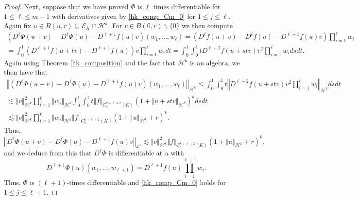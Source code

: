 \documentclass[11pt,reqno]{amsart}
\numberwithin{equation}{section}
\providecommand{\norm}[1]{\left\Vert#1\right\Vert}
\def\ls{\lesssim}
\providecommand{\norm}[1]{\left\Vert#1\right\Vert}
\def\ls{\lesssim}
\def\h{\mathcal{H}}
\def\L{\mathcal{L}}
\begin{document}
\begin{proof}
Next, suppose that we have proved $\Phi$ is $\ell$ times differentiable for $1\le \ell \le m-1$ with derivatives given by \eqref{hk_comp_Cm_0} for $1\le j \le \ell$.    Again fix $u \in B(u,r) \subseteq \mathcal{E}_K \cap \h^k$.  For $v \in B(0,r) \backslash \{0\}$ we then compute 
\begin{multline}
(D^\ell \Phi(u+v)  - D^\ell\Phi(u) - D^{\ell+1} f(u)v) (w_1,\dotsc,w_\ell) = (D^\ell f(u+v) -D^\ell f(u) - D^{\ell+1}f(u)v) \prod_{i=1}^\ell w_i  \\
= \int_0^1 (D^{\ell+1} f(u+tv) - D^{\ell+1}f(u))v \prod_{i=1}^\ell w_i dt = \int_0^1 \int_0^1 t D^{\ell+2} f(u+stv) v^2 \prod_{i=1}^\ell w_i ds dt. 
\end{multline}
Again using Theorem \ref{hk_composition} and the fact that $\h^k$ is an algebra, we then have that 
\begin{multline}
\norm{(D^\ell \Phi(u+v)  - D^\ell\Phi(u) - D^{\ell+1} f(u)v) (w_1,\dotsc,w_\ell)}_{\h^k} \le \int_0^1 \int_0^1 t \norm{D^{\ell+2} f(u+stv) v^2 \prod_{i=1}^\ell w_i}_{\h^k} ds dt \\
\ls \norm{v}_{\h^k}^2 \prod_{i=1}^\ell \norm{w_i}_{\h^k} \int_0^1 \int_0^1 t \norm{f}_{C^{k+\ell+2}_b(K)}(1+ \norm{u+st v}_{\h^k} )^k dsdt  \\
\ls \norm{v}_{\h^k}^2 \prod_{i=1}^\ell \norm{w_i}_{\h^k}  \norm{f}_{C^{k+\ell+2}_b(K)} (1+ \norm{u}_{\h^k} + r)^k.
\end{multline}
Thus, 
\begin{equation}
 \norm{D^\ell \Phi(u+v)  - D^\ell\Phi(u) - D^{\ell+1} f(u)v }_{\L^\ell } \ls \norm{v}_{\h^k}^2   \norm{f}_{C^{k+\ell+2}_b(K)} (1+ \norm{u}_{\h^k} + r)^k,
\end{equation}
and we deduce from this that $D^\ell \Phi$ is differentiable at $u$ with 
\begin{equation}
D^{\ell+1} \Phi(u)(w_1,\dotsc,w_{\ell+1}) = D^{\ell+1}f(u) \prod_{i=1}^{\ell+1} w_i. 
\end{equation}
Thus, $\Phi$ is $(\ell+1)$-times differentiable and \eqref{hk_comp_Cm_0} holds for $1\le j \le \ell+1$.


\end{proof}
\end{document}
